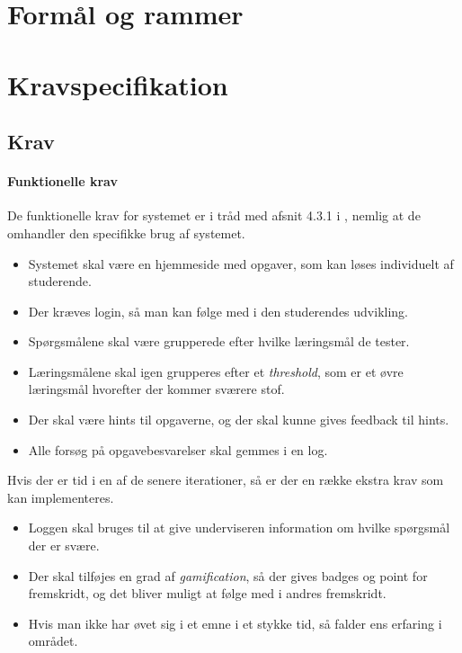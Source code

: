 \documentclass[12pt]{article}
\begin{document}
\section{Formål og rammer}
\label{sec:formal_og_rammer}
\section{Kravspecifikation}
\label{sec:kravspecifikation}

\subsection{Krav}
\label{sub:krav}
\paragraph{Funktionelle krav}
De funktionelle krav for systemet er i tråd med afsnit 4.3.1 i \cite{OOSE}, nemlig at de omhandler den specifikke brug af systemet.
\begin{itemize}
    \item Systemet skal være en hjemmeside med opgaver, som kan løses individuelt af studerende.
    \item Der kræves login, så man kan følge med i den studerendes udvikling.
    \item Spørgsmålene skal være grupperede efter hvilke læringsmål de tester.
    \item Læringsmålene skal igen grupperes efter et \emph{threshold}, som er et øvre læringsmål hvorefter der kommer sværere stof.
    \item Der skal være hints til opgaverne, og der skal kunne gives feedback til hints.
    \item Alle forsøg på opgavebesvarelser skal gemmes i en log.
\end{itemize}
Hvis der er tid i en af de senere iterationer, så er der en række ekstra krav som kan implementeres.
\begin{itemize}
    \item Loggen skal bruges til at give underviseren information om hvilke spørgsmål der er svære.
    \item Der skal tilføjes en grad af \emph{gamification}, så der gives badges og point for fremskridt, og det bliver muligt at følge med i andres fremskridt.
    \item Hvis man ikke har øvet sig i et emne i et stykke tid, så falder ens erfaring i området.
\end{itemize}
\end{document}
